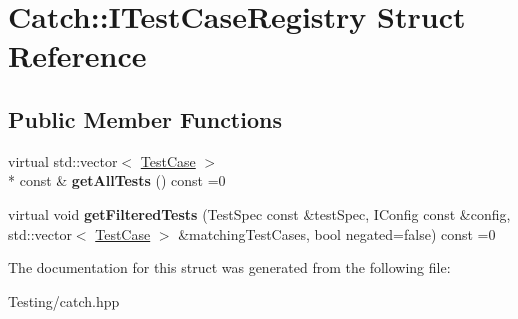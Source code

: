\hypertarget{struct_catch_1_1_i_test_case_registry}{\section{Catch\-:\-:I\-Test\-Case\-Registry Struct Reference}
\label{struct_catch_1_1_i_test_case_registry}
}
\subsection*{Public Member Functions}
\begin{DoxyCompactItemize}
\item 
\hypertarget{struct_catch_1_1_i_test_case_registry_ad6e4d4a621655123f73ae98cfeda063d}{virtual std\-::vector$<$ \hyperlink{class_catch_1_1_test_case}{Test\-Case} $>$\\*
 const \& {\bfseries get\-All\-Tests} () const =0}\label{struct_catch_1_1_i_test_case_registry_ad6e4d4a621655123f73ae98cfeda063d}

\item 
\hypertarget{struct_catch_1_1_i_test_case_registry_adde9e447d842916c62a11b433d09c517}{virtual void {\bfseries get\-Filtered\-Tests} (Test\-Spec const \&test\-Spec, I\-Config const \&config, std\-::vector$<$ \hyperlink{class_catch_1_1_test_case}{Test\-Case} $>$ \&matching\-Test\-Cases, bool negated=false) const =0}\label{struct_catch_1_1_i_test_case_registry_adde9e447d842916c62a11b433d09c517}

\end{DoxyCompactItemize}


The documentation for this struct was generated from the following file\-:\begin{DoxyCompactItemize}
\item 
Testing/catch.\-hpp\end{DoxyCompactItemize}
